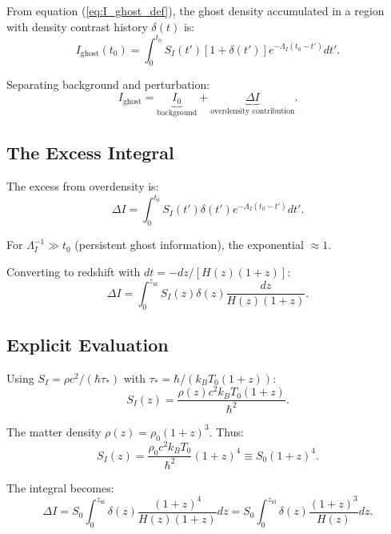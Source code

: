 \documentclass[12pt, a4paper]{article}
\begin{document}
From equation (\ref{eq:I_ghost_def}), the ghost density accumulated in a region with density contrast history $\delta(t)$ is:
\begin{equation}
    I_{\text{ghost}}(t_0) = \int_0^{t_0} S_I(t') \left[1 + \delta(t')\right] e^{-\Lambda_I(t_0 - t')} dt'.
    \label{eq:I_ghost_integral}
\end{equation}

Separating background and perturbation:
\begin{equation}
    I_{\text{ghost}} = \underbrace{I_0}_{\text{background}} + \underbrace{\Delta I}_{\text{overdensity contribution}}.
\end{equation}

\subsection{The Excess Integral}

The excess from overdensity is:
\begin{equation}
    \Delta I = \int_0^{t_0} S_I(t') \delta(t') e^{-\Lambda_I(t_0 - t')} dt'.
    \label{eq:Delta_I}
\end{equation}

For $\Lambda_I^{-1} \gg t_0$ (persistent ghost information), the exponential $\approx 1$.

Converting to redshift with $dt = -dz / [H(z)(1+z)]$:
\begin{equation}
    \Delta I = \int_0^{z_{\text{nl}}} S_I(z) \delta(z) \frac{dz}{H(z)(1+z)}.
    \label{eq:Delta_I_z}
\end{equation}

\subsection{Explicit Evaluation}

Using $S_I = \rho c^2 / (\hbar \tau_*)$ with $\tau_* = \hbar/(k_B T_0 (1+z))$:
\begin{equation}
    S_I(z) = \frac{\rho(z) c^2 k_B T_0 (1+z)}{\hbar^2}.
\end{equation}

The matter density $\rho(z) = \rho_0 (1+z)^3$. Thus:
\begin{equation}
    S_I(z) = \frac{\rho_0 c^2 k_B T_0}{\hbar^2} (1+z)^4 \equiv S_0 (1+z)^4.
\end{equation}

The integral becomes:
\begin{equation}
    \Delta I = S_0 \int_0^{z_{\text{nl}}} \delta(z) \frac{(1+z)^4}{H(z)(1+z)} dz = S_0 \int_0^{z_{\text{nl}}} \delta(z) \frac{(1+z)^3}{H(z)} dz.
    \label{eq:Delta_I_explicit}
\end{equation}
\end{document}
